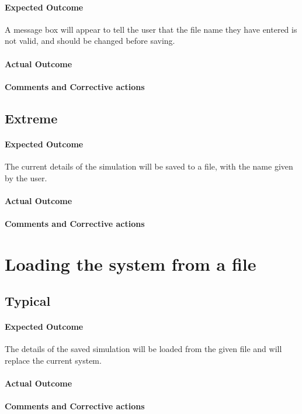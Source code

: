 \paragraph{Expected Outcome}
A message box will appear to tell the user that the file name they have entered
is not valid, and should be changed before saving.
\paragraph{Actual Outcome}
\paragraph{Comments and Corrective actions}

\subsection{Extreme}
\paragraph{Expected Outcome}
The current details of the simulation will be saved to a file, with the name
given by the user.
\paragraph{Actual Outcome}
\paragraph{Comments and Corrective actions}


\section{Loading the system from a file}
\subsection{Typical}
\paragraph{Expected Outcome}
The details of the saved simulation will be loaded from the given file and will
replace the current system.
\paragraph{Actual Outcome}
\paragraph{Comments and Corrective actions}

